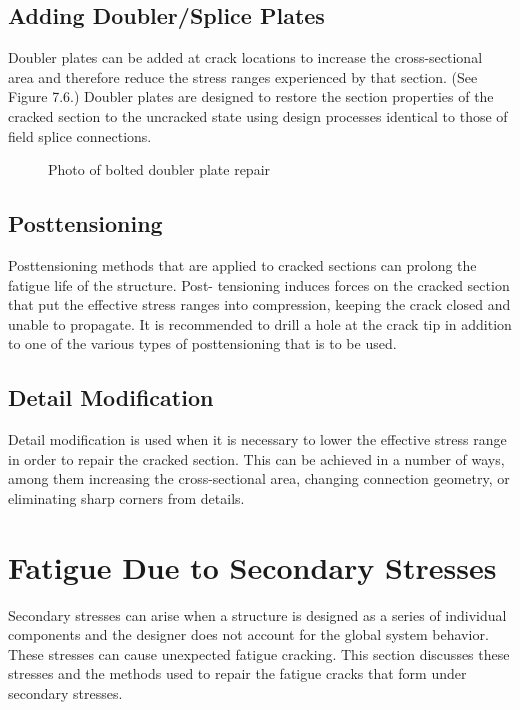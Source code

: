 \subsection{Adding Doubler/Splice Plates}

Doubler plates can be added at crack locations to increase the cross-sectional area and therefore reduce the stress
ranges experienced by that section. (See Figure 7.6.) Doubler plates are designed to restore the section properties of
the cracked section to the uncracked state using design processes identical to those of field splice connections.

\begin{figure}
  \caption{Photo of bolted doubler plate repair}
  \label{fig:bolted-double-plate-repair}
\end{figure}

\subsection{Posttensioning}
Posttensioning methods that are applied to cracked sections can prolong the fatigue life of the structure. Post-
tensioning induces forces on the cracked section that put the effective stress ranges into compression, keeping the
crack closed and unable to propagate. It is recommended to drill a hole at the crack tip in addition to one of the
various types of posttensioning that is to be used.


\subsection{Detail Modification}
Detail modification is used when it is necessary to lower the effective stress range in order to repair the cracked
section. This can be achieved in a number of ways, among them increasing the cross-sectional area, changing
connection geometry, or eliminating sharp corners from details.

\section{Fatigue Due to Secondary Stresses}

Secondary stresses can arise when a structure is designed as a series of individual components and the designer
does not account for the global system behavior. These stresses can cause unexpected fatigue cracking. This section
discusses these stresses and the methods used to repair the fatigue cracks that form under secondary stresses.



